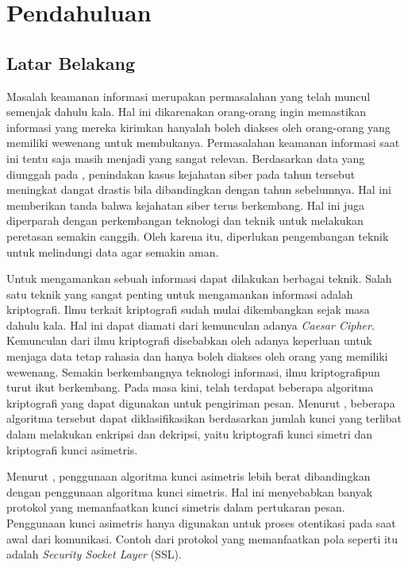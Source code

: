 \chapter{Pendahuluan}

\section{Latar Belakang}
Masalah keamanan informasi merupakan permasalahan yang telah muncul semenjak dahulu kala. Hal ini dikarenakan orang-orang ingin memastikan informasi yang mereka kirimkan hanyalah boleh diakses oleh orang-orang yang memiliki wewenang untuk membukanya. Permasalahan keamanan informasi saat ini tentu saja masih menjadi yang sangat relevan. Berdasarkan data yang diunggah pada \textcite{pusiknaspolri_cybercrime_2022}, penindakan kasus kejahatan siber pada tahun tersebut meningkat dangat drastis bila dibandingkan dengan tahun sebelumnya. Hal ini memberikan tanda bahwa kejahatan siber terus berkembang. Hal ini juga diperparah dengan perkembangan teknologi dan teknik untuk melakukan peretasan semakin canggih. Oleh karena itu, diperlukan pengembangan teknik untuk melindungi data agar semakin aman.

Untuk mengamankan sebuah informasi dapat dilakukan berbagai teknik. Salah satu teknik yang sangat penting untuk mengamankan informasi adalah kriptografi. Ilmu terkait kriptografi sudah mulai dikembangkan sejak masa dahulu kala. Hal ini dapat diamati dari kemunculan adanya \emph{Caesar Cipher}. Kemunculan dari ilmu kriptografi disebabkan oleh adanya keperluan untuk menjaga data tetap rahasia dan hanya boleh diakses oleh orang yang memiliki wewenang. Semakin berkembangnya teknologi informasi, ilmu kriptografipun turut ikut berkembang. Pada masa kini, telah terdapat beberapa  algoritma kriptografi yang dapat digunakan untuk pengiriman pesan. Menurut \textcite{munir2019}, beberapa algoritma tersebut dapat diklasifikasikan berdasarkan jumlah kunci yang terlibat dalam melakukan enkripsi dan dekripsi, yaitu kriptografi kunci simetri dan kriptografi kunci asimetris.

Menurut \textcite{halak2022}, penggunaan algoritma kunci asimetris lebih berat dibandingkan dengan penggunaan algoritma kunci simetris. Hal ini menyebabkan banyak protokol yang memanfaatkan kunci simetris dalam pertukaran pesan. Penggunaan kunci asimetris hanya digunakan untuk proses otentikasi pada saat awal dari komunikasi. Contoh dari protokol yang memanfaatkan pola seperti itu adalah \emph{Security Socket Layer} (SSL).

